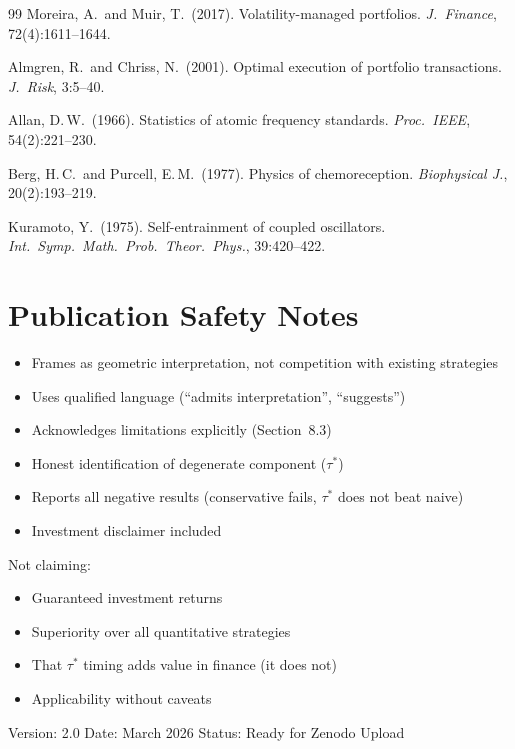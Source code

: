 \documentclass[11pt,a4paper]{article}
\begin{document}
\begin{thebibliography}{99}
 Moreira, A.\ and Muir, T.\ (2017). Volatility-managed portfolios. \emph{J.\ Finance}, 72(4):1611--1644.

 Almgren, R.\ and Chriss, N.\ (2001). Optimal execution of portfolio transactions. \emph{J.\ Risk}, 3:5--40.

 Allan, D.\,W.\ (1966). Statistics of atomic frequency standards. \emph{Proc.\ IEEE}, 54(2):221--230.

 Berg, H.\,C.\ and Purcell, E.\,M.\ (1977). Physics of chemoreception. \emph{Biophysical J.}, 20(2):193--219.

 Kuramoto, Y.\ (1975). Self-entrainment of coupled oscillators. \emph{Int.\ Symp.\ Math.\ Prob.\ Theor.\ Phys.}, 39:420--422.
\end{thebibliography}

\appendix
\section{Publication Safety Notes}

\begin{itemize}[nosep]
\item Frames as geometric interpretation, not competition with existing strategies
\item Uses qualified language (``admits interpretation'', ``suggests'')
\item Acknowledges limitations explicitly (Section~8.3)
\item Honest identification of degenerate component ($\tau^*$)
\item Reports all negative results (conservative fails, $\tau^*$ does not beat naive)
\item Investment disclaimer included
\end{itemize}

\medskip\noindent Not claiming:
\begin{itemize}[nosep]
\item Guaranteed investment returns
\item Superiority over all quantitative strategies
\item That $\tau^*$ timing adds value in finance (it does not)
\item Applicability without caveats
\end{itemize}

\medskip\noindent
Version: 2.0 \quad Date: March 2026 \quad Status: Ready for Zenodo Upload
\end{document}
